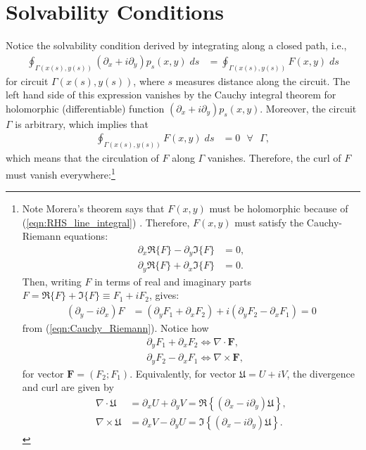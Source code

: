 \documentclass[10pt]{amsart}
\begin{document}
\section{Solvability Conditions}
Notice the solvability condition derived by integrating along a closed path, i.e., 
\begin{align}
\oint_{\Gamma(x(s),y(s))}  \left( \partial_x  + i \partial_y  \right) p_s (x,y) \; ds & = \oint_{\Gamma(x(s),y(s))} F(x,y) \; ds
\end{align}
for circuit $\Gamma(x(s),y(s))$, where $s$ measures distance along the circuit.
The left hand side of this expression vanishes by the Cauchy integral theorem for holomorphic (differentiable) function $\left( \partial_x  + i \partial_y  \right) p_s (x,y)$.
Moreover, the circuit $\Gamma$ is arbitrary, which implies that 
\begin{align}
 \oint_{\Gamma(x(s),y(s))} F(x,y) \; ds & = 0 \text{~~} \forall \text{~~} \Gamma ,
 \label{eqn:RHS_line_integral}
\end{align}
which means that the circulation of $F$ along $\Gamma$ vanishes.
Therefore, the curl of $F$ must vanish everywhere:\footnote{\label{fn:F_constraints}Note Morera's theorem says that $F(x,y)$ must be holomorphic because of (\ref{eqn:RHS_line_integral}) \citep{ablowitz&fokas03}.
Therefore, $F(x,y)$ must satisfy the Cauchy-Riemann equations:
\begin{align}
\partial_x \Re \{ F \} - \partial_y \Im \{ F \} & = 0 , \nonumber \\
\partial_y \Re \{ F \} + \partial_x \Im \{ F \} & = 0 . 
\label{eqn:Cauchy_Riemann}
\end{align}
Then, writing $F$ in terms of real and imaginary parts $F = \Re \{F\} + \Im \{F\} \equiv F_1 + i F_2$, gives:
\begin{align}
\left( \partial_y  - i \partial_x\right) F &= \left( \partial_y F_1 + \partial_x F_2 \right) + i \left( \partial_y F_2 - \partial_x F_1 \right)  = 0 \nonumber 
\end{align}
from (\ref{eqn:Cauchy_Riemann}).
Notice how 
\begin{align}
& \partial_y F_1 + \partial_x F_2 \Leftrightarrow \nabla \cdot \mathbf{F} , \nonumber \\
& \partial_y F_2 - \partial_x F_1   \Leftrightarrow \nabla \times \mathbf{F} , \nonumber 
\end{align}
for vector $\mathbf{F} = (F_2; F_1)$.
Equivalently, for vector $\mathfrak{U} = U + i V$, the divergence and curl are given by
\begin{align}
\nabla \cdot \mathfrak{U} & = \partial_x U + \partial_y V = \Re \left\{ \left( \partial_x - i \partial_y \right) \mathfrak{U} \right\} , \nonumber \\
\nabla \times \mathfrak{U} & = \partial_x V - \partial_y U = \Im \left\{ \left( \partial_x - i \partial_y \right) \mathfrak{U} \right\} .
\end{align}
 }
\end{document}
